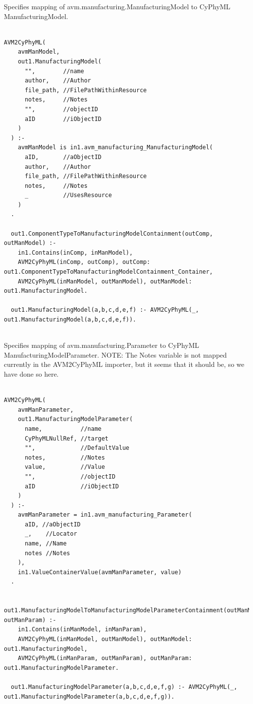 Specifies mapping of avm.manufacturing.ManufacturingModel to CyPhyML ManufacturingModel.
\begin{lstlisting}

AVM2CyPhyML(
    avmManModel,
    out1.ManufacturingModel(
      "",        //name
      author,    //Author
      file_path, //FilePathWithinResource
      notes,     //Notes
      "",        //objectID
      aID        //iObjectID
    )
  ) :-
    avmManModel is in1.avm_manufacturing_ManufacturingModel(
      aID,       //aObjectID
      author,    //Author
      file_path, //FilePathWithinResource
      notes,     //Notes
      _          //UsesResource
    )
  .

  out1.ComponentTypeToManufacturingModelContainment(outComp, outManModel) :-
    in1.Contains(inComp, inManModel),
    AVM2CyPhyML(inComp, outComp), outComp: out1.ComponentTypeToManufacturingModelContainment_Container,
    AVM2CyPhyML(inManModel, outManModel), outManModel: out1.ManufacturingModel.

  out1.ManufacturingModel(a,b,c,d,e,f) :- AVM2CyPhyML(_, out1.ManufacturingModel(a,b,c,d,e,f)).


\end{lstlisting}

Specifies mapping of avm.manufacturing.Parameter to CyPhyML ManufacturingModelParameter. NOTE: The Notes variable is not mapped currently in the AVM2CyPhyML importer, but it seems that it should be, so we have done so here.
\begin{lstlisting}

AVM2CyPhyML(
    avmManParameter,
    out1.ManufacturingModelParameter(
      name,           //name
      CyPhyMLNullRef, //target
      "",             //DefaultValue
      notes,          //Notes
      value,          //Value
      "",             //objectID
      aID             //iObjectID
    )
  ) :-
    avmManParameter = in1.avm_manufacturing_Parameter(
      aID, //aObjectID
      _,    //Locator
      name, //Name
      notes //Notes
    ),
    in1.ValueContainerValue(avmManParameter, value)
  .

  out1.ManufacturingModelToManufacturingModelParameterContainment(outManModel, outManParam) :-
    in1.Contains(inManModel, inManParam),
    AVM2CyPhyML(inManModel, outManModel), outManModel: out1.ManufacturingModel,
    AVM2CyPhyML(inManParam, outManParam), outManParam: out1.ManufacturingModelParameter.

  out1.ManufacturingModelParameter(a,b,c,d,e,f,g) :- AVM2CyPhyML(_, out1.ManufacturingModelParameter(a,b,c,d,e,f,g)).


\end{lstlisting}

